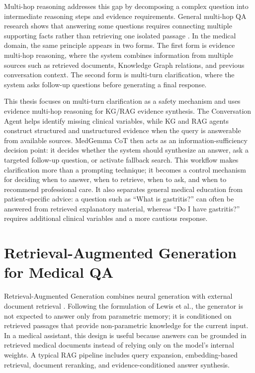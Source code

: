 Multi-hop reasoning addresses this gap by decomposing a complex question into intermediate reasoning steps and evidence requirements. General multi-hop QA research shows that answering some questions requires connecting multiple supporting facts rather than retrieving one isolated passage \cite{hotpotqa}. In the medical domain, the same principle appears in two forms. The first form is evidence multi-hop reasoning, where the system combines information from multiple sources such as retrieved documents, Knowledge Graph relations, and previous conversation context. The second form is multi-turn clarification, where the system asks follow-up questions before generating a final response.

This thesis focuses on multi-turn clarification as a safety mechanism and uses evidence multi-hop reasoning for KG/RAG evidence synthesis. The Conversation Agent helps identify missing clinical variables, while KG and RAG agents construct structured and unstructured evidence when the query is answerable from available sources. MedGemma CoT then acts as an information-sufficiency decision point: it decides whether the system should synthesize an answer, ask a targeted follow-up question, or activate fallback search. This workflow makes clarification more than a prompting technique; it becomes a control mechanism for deciding when to answer, when to retrieve, when to ask, and when to recommend professional care. It also separates general medical education from patient-specific advice: a question such as ``What is gastritis?'' can often be answered from retrieved explanatory material, whereas ``Do I have gastritis?'' requires additional clinical variables and a more cautious response.

\section{Retrieval-Augmented Generation for Medical QA}

Retrieval-Augmented Generation combines neural generation with external document retrieval \cite{rag_retrieval}. Following the formulation of Lewis et al., the generator is not expected to answer only from parametric memory; it is conditioned on retrieved passages that provide non-parametric knowledge for the current input. In a medical assistant, this design is useful because answers can be grounded in retrieved medical documents instead of relying only on the model's internal weights. A typical RAG pipeline includes query expansion, embedding-based retrieval, document reranking, and evidence-conditioned answer synthesis.

